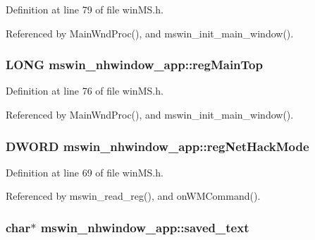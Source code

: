 Definition at line 79 of file win\+M\+S.\+h.



Referenced by Main\+Wnd\+Proc(), and mswin\+\_\+init\+\_\+main\+\_\+window().

\hypertarget{structmswin__nhwindow__app_a658a499d91cb14c1da4dcb44b4bb1633}{
\subsubsection[{reg\+Main\+Top}]{\setlength{\rightskip}{0pt plus 5cm}L\+O\+N\+G mswin\+\_\+nhwindow\+\_\+app\+::reg\+Main\+Top}}\label{structmswin__nhwindow__app_a658a499d91cb14c1da4dcb44b4bb1633}


Definition at line 76 of file win\+M\+S.\+h.



Referenced by Main\+Wnd\+Proc(), and mswin\+\_\+init\+\_\+main\+\_\+window().

\hypertarget{structmswin__nhwindow__app_aded0a94e58119ccbb1b375ccd3de7d2e}{
\subsubsection[{reg\+Net\+Hack\+Mode}]{\setlength{\rightskip}{0pt plus 5cm}D\+W\+O\+R\+D mswin\+\_\+nhwindow\+\_\+app\+::reg\+Net\+Hack\+Mode}}\label{structmswin__nhwindow__app_aded0a94e58119ccbb1b375ccd3de7d2e}


Definition at line 69 of file win\+M\+S.\+h.



Referenced by mswin\+\_\+read\+\_\+reg(), and on\+W\+M\+Command().

\hypertarget{structmswin__nhwindow__app_ace0e848571fb0210599f108fe2bbc009}{
\subsubsection[{saved\+\_\+text}]{\setlength{\rightskip}{0pt plus 5cm}char$\ast$ mswin\+\_\+nhwindow\+\_\+app\+::saved\+\_\+text}}\label{structmswin__nhwindow__app_ace0e848571fb0210599f108fe2bbc009}



